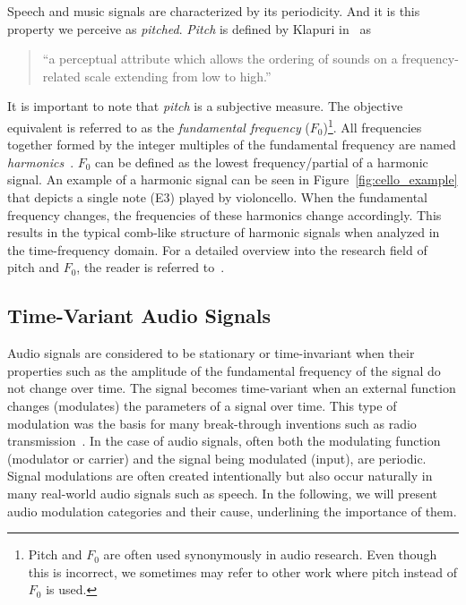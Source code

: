 Speech and music signals are characterized by its periodicity.
And it is this property we perceive as \emph{pitched}.
\emph{Pitch} is defined by Klapuri in~\cite{klapuri06book} as 

\begin{quote}
``a perceptual attribute which allows the ordering of sounds on a frequency-related scale extending from low to high.''
\end{quote}

It is important to note that \emph{pitch} is a subjective measure.
The objective equivalent is referred to as the \emph{fundamental frequency} (\(F_0\))\footnote{Pitch and $F_0$ are often used synonymously in audio research. 
Even though this is incorrect, we sometimes may refer to other work where pitch instead of $F_0$ is used.}.
All frequencies together formed by the integer multiples of the fundamental frequency are named \textit{harmonics}~\cite{schenker54}.
\(F_0\) can be defined as the lowest frequency/partial of a harmonic signal.
An example of a harmonic signal can be seen in Figure~\ref{fig:cello_example} that depicts a single note (E3) played by violoncello.
When the fundamental frequency changes, the frequencies of these harmonics change accordingly.
This results in the typical comb-like structure of harmonic signals when analyzed in the time-frequency domain.
For a detailed overview into the research field of pitch and \(F_0\), the reader is referred to~\cite{klapuri06book}.

\subsection{Time-Variant Audio Signals}\label{sub:time-variant-audio-signals}

Audio signals are considered to be stationary or time-invariant when their properties such as the amplitude of the fundamental frequency of the signal do not change over time.
The signal becomes time-variant when an external function changes (modulates) the parameters of a signal over time.
This type of modulation was the basis for many break-through inventions such as radio transmission~\cite{shannon48}.
In the case of audio signals, often both the modulating function (modulator or carrier) and the signal being modulated (input), are periodic.
Signal modulations are often created intentionally but also occur naturally in many real-world audio signals such as speech.
In the following, we will present audio modulation categories and their cause, underlining the importance of them.

